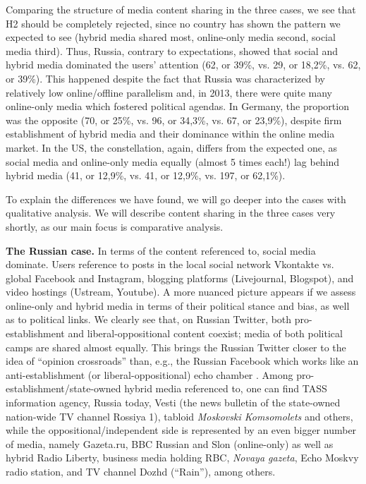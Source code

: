 Comparing the structure of media content sharing in the three cases, we see that H2 should be completely rejected, since no country has shown the pattern we expected to see (hybrid media shared most, online-only media second, social media third). Thus, Russia, contrary to expectations, showed that social and hybrid media dominated the users’ attention (62, or 39\%, vs. 29, or 18,2\%, vs. 62, or 39\%). This happened despite the fact that Russia was characterized by relatively low online/offline parallelism and, in 2013, there were quite many online-only media which fostered political agendas. In Germany, the proportion was the opposite (70, or 25\%, vs. 96, or 34,3\%, vs. 67, or 23,9\%), despite firm establishment of hybrid media and their dominance within the online media market. In the US, the constellation, again, differs from the expected one, as social media and online-only media equally (almost 5 times each!) lag behind hybrid media (41, or 12,9\%, vs. 41, or 12,9\%, vs. 197, or 62,1\%).

To explain the differences we have found, we will go deeper into the cases with qualitative analysis. We will describe content sharing in the three cases very shortly, as our main focus is comparative analysis.

\textbf{The Russian case.} In terms of the content referenced to, social media dominate. Users reference to posts in the local social network Vkontakte vs. global Facebook and Instagram, blogging platforms (Livejournal, Blogspot), and video hostings (Ustream, Youtube). A more nuanced picture appears if we assess online-only and hybrid media in terms of their political stance and bias, as well as to political links. We clearly see that, on Russian Twitter, both pro-establishment and liberal-oppositional content coexist; media of both political camps are shared almost equally. This brings the Russian Twitter closer to the idea of “opinion crossroads” than, e.g., the Russian Facebook which works like an anti-establishment (or liberal-oppositional) echo chamber \cite{BodrunovaLitvinenko}. Among pro-establishment/state-owned hybrid media referenced to, one can find TASS information agency, Russia today, Vesti (the news bulletin of the state-owned nation-wide TV channel Rossiya 1), tabloid \textit{Moskovski Komsomolets} and others, while the oppositional/independent side is represented by an even bigger number of media, namely Gazeta.ru, BBC Russian and Slon (online-only) as well as hybrid Radio Liberty, business media holding RBC, \textit{Novaya gazeta}, Echo Moskvy radio station, and TV channel Dozhd (“Rain”), among others.

